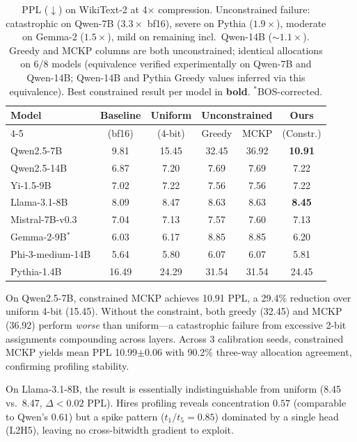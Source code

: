 \begin{table}[t]
\centering
\small
\caption{PPL ($\downarrow$) on WikiText-2 at 4$\times$ compression. Unconstrained failure: catastrophic on Qwen-7B ($3.3\times$ bf16), severe on Pythia ($1.9\times$), moderate on Gemma-2 ($1.5\times$), mild on remaining incl.\ Qwen-14B (${\sim}1.1\times$). Greedy and MCKP columns are both unconstrained; identical allocations on 6/8 models (equivalence verified experimentally on Qwen-7B and Qwen-14B; Qwen-14B and Pythia Greedy values inferred via this equivalence). Best constrained result per model in \textbf{bold}. $^*$BOS-corrected.}
\label{tab:main_results}
\begin{tabular}{lccccc}
\toprule
Model & Baseline & Uniform & \multicolumn{2}{c}{Unconstrained} & Ours \\
\cmidrule(lr){4-5}
 & (bf16) & (4-bit) & Greedy & MCKP & (Constr.) \\
\midrule
Qwen2.5-7B      & 9.81  & 15.45 & 32.45 & 36.92 & \textbf{10.91} \\
Qwen2.5-14B     & 6.87  & 7.20  & 7.69  & 7.69  & 7.22 \\
Yi-1.5-9B       & 7.02  & 7.22  & 7.56  & 7.56  & 7.22 \\
Llama-3.1-8B    & 8.09  & 8.47  & 8.63  & 8.63  & \textbf{8.45} \\
Mistral-7B-v0.3 & 7.04  & 7.13  & 7.57  & 7.60  & 7.13 \\
Gemma-2-9B$^*$  & 6.03  & 6.17  & 8.85  & 8.85  & 6.20 \\
Phi-3-medium-14B & 5.64 & 5.80  & 6.07  & 6.07  & 5.81 \\
Pythia-1.4B     & 16.49 & 24.29 & 31.54 & 31.54 & 24.45 \\
\bottomrule
\end{tabular}
\end{table}

On Qwen2.5-7B, constrained MCKP achieves 10.91 PPL, a 29.4\% reduction over uniform 4-bit (15.45).
Without the constraint, both greedy (32.45) and MCKP (36.92) perform \emph{worse} than uniform---a catastrophic failure from excessive 2-bit assignments compounding across layers.
Across 3 calibration seeds, constrained MCKP yields mean PPL 10.99$\pm$0.06 with 90.2\% three-way allocation agreement, confirming profiling stability.

On Llama-3.1-8B, the result is essentially indistinguishable from uniform (8.45 vs.\ 8.47, $\Delta < 0.02$ PPL).
Hires profiling reveals concentration $0.57$ (comparable to Qwen's $0.61$) but a spike pattern ($t_1/t_5{=}0.85$) dominated by a single head (L2H5), leaving no cross-bitwidth gradient to exploit.

